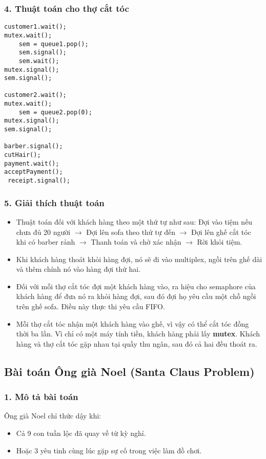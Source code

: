 \subsubsection*{4. Thuật toán cho thợ cắt tóc}
\begin{lstlisting}
customer1.wait();
mutex.wait();
    sem = queue1.pop();
    sem.signal();
    sem.wait();
mutex.signal();
sem.signal();

customer2.wait();
mutex.wait();
    sem = queue2.pop(0);
mutex.signal();
sem.signal();

barber.signal();
cutHair();
payment.wait();
acceptPayment();
 receipt.signal();
\end{lstlisting}
\subsubsection*{5. Giải thích thuật toán}
\begin{itemize}
    \item Thuật toán đối với khách hàng theo một thứ tự như sau: Đợi vào tiệm nếu chưa đủ 20 người $\longrightarrow$ Đợi lên sofa theo thứ tự đến $\longrightarrow$ Đợi lên ghế cắt tóc khi có barber rảnh $\longrightarrow$ Thanh toán và chờ xác nhận $\longrightarrow$ Rời khỏi tiệm.
    \item Khi khách hàng thoát khỏi hàng đợi, nó sẽ đi vào multiplex, ngồi trên ghế dài và thêm chính nó vào hàng đợi thứ hai.
    \item Đối với mỗi thợ cắt tóc đợi một khách hàng vào, ra hiệu cho semaphore của khách hàng để đưa nó ra khỏi hàng đợi, sau đó đợi họ yêu cầu một chỗ ngồi trên ghế sofa. Điều này thực thi yêu cầu FIFO.
    \item Mỗi thợ cắt tóc nhận một khách hàng vào ghế, vì vậy có thể cắt tóc đồng thời ba lần. Vì chỉ có một máy tính tiền, khách hàng phải lấy \textbf{mutex}. Khách hàng và thợ cắt tóc gặp nhau tại quầy thu ngân, sau đó cả hai đều thoát ra.

\newpage
\end{itemize}
\subsection{Bài toán Ông già Noel (Santa Claus Problem)}
\subsubsection*{1. Mô tả bài toán}
Ông già Noel chỉ thức dậy khi:
\begin{itemize}
  \item Cả 9 con tuần lộc đã quay về từ kỳ nghỉ.
  \item Hoặc 3 yêu tinh cùng lúc gặp sự cố trong việc làm đồ chơi.
\end{itemize}

